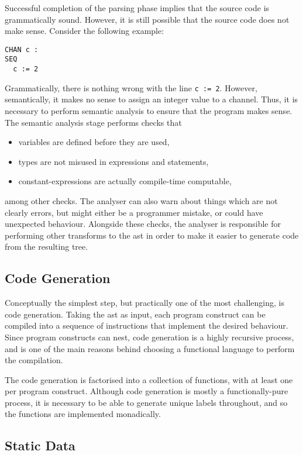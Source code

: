 Successful completion of the parsing phase implies that the source code is
grammatically sound. However, it is still possible that the source code does not
make sense. Consider the following example:
\begin{lstlisting}[language=occam]
CHAN c :
SEQ
  c := 2
\end{lstlisting}
Grammatically, there is nothing wrong with the line \texttt{c := 2}. However,
semantically, it makes no sense to assign an integer value to a channel. Thus,
it is necessary to perform semantic analysis to ensure that the program makes
sense. The semantic analysis stage performs checks that
\begin{itemize}
  \item variables are defined before they are used,
  \item types are not misused in expressions and statements,
  \item constant-expressions are actually compile-time computable,
\end{itemize}
among other checks. The analyser can also warn about things which are not
clearly errors, but might either be a programmer mistake, or could have
unexpected behaviour. Alongside these checks, the analyser is responsible for
performing other transforms to the \gls{ast} in order to make it easier to
generate code from the resulting tree.

\subsection{Code Generation}

Conceptually the simplest step, but practically one of the most challenging,
is code generation. Taking the \gls{ast} as input, each program construct can be
compiled into a sequence of instructions that implement the desired behaviour.
Since program constructs can nest, code generation is a highly recursive
process, and is one of the main reasons behind choosing a functional language to
perform the compilation.

The code generation is factorised into a collection of functions, with at least
one per program construct. Although code generation is mostly a
functionally-pure process, it is necessary to be able to generate unique labels
throughout, and so the functions are implemented monadically.

\subsection{Static Data} \label{static-blob}

